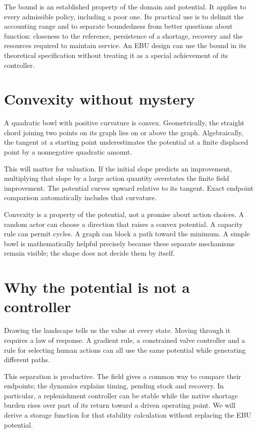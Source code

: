 The bound is an established property of the domain and potential. It applies to every admissible policy, including a poor one. Its practical use is to delimit the accounting range and to separate boundedness from better questions about function: closeness to the reference, persistence of a shortage, recovery and the resources required to maintain service. An EBU design can use the bound in its theoretical specification without treating it as a special achievement of its controller.

\section{Convexity without mystery}
A quadratic bowl with positive curvature is convex. Geometrically, the straight chord joining two points on its graph lies on or above the graph. Algebraically, the tangent at a starting point underestimates the potential at a finite displaced point by a nonnegative quadratic amount.

This will matter for valuation. If the initial slope predicts an improvement, multiplying that slope by a large action quantity overstates the finite field improvement. The potential curves upward relative to its tangent. Exact endpoint comparison automatically includes that curvature.

Convexity is a property of the potential, not a promise about action choices. A random actor can choose a direction that raises a convex potential. A capacity rule can permit cycles. A graph can block a path toward the minimum. A simple bowl is mathematically helpful precisely because these separate mechanisms remain visible; the shape does not decide them by itself.

\section{Why the potential is not a controller}
Drawing the landscape tells us the value at every state. Moving through it requires a law of response. A gradient rule, a constrained valve controller and a rule for selecting human actions can all use the same potential while generating different paths.

This separation is productive. The field gives a common way to compare their endpoints; the dynamics explains timing, pending stock and recovery. In particular, a replenishment controller can be stable while the native shortage burden rises over part of its return toward a driven operating point. We will derive a storage function for that stability calculation without replacing the EBU potential.

